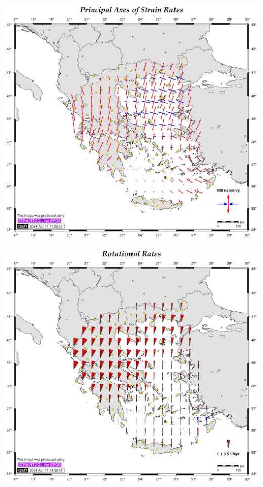 \documentclass[landscape,a0paper,fontscale=0.346]{baposter} %
\begin{document}
\begin{poster}
{\begin{minipage}[c]{0.34\linewidth}
\end{minipage}
\begin{minipage}[c]{0.33\linewidth}
  \includegraphics[width=.97\textwidth]{hepos22-output_str.jpg}
\end{minipage}
\begin{minipage}[c]{0.33\linewidth}
  \includegraphics[width=.97\textwidth]{hepos22-output_rot.jpg}
\end{minipage}




}
\end{poster}
\end{document}
